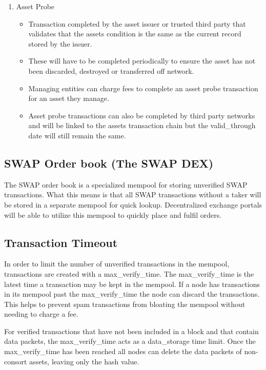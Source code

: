 \documentclass[12pt]{article}
\begin{document}
\begin{enumerate}
	\item Asset Probe
		\begin{itemize}
			\item{Transaction completed by the asset issuer or 
				trusted third party that validates that the assets condition 
				is the same as the current record stored by the issuer.}
			\item{These will have to be 
				completed periodically to ensure the asset has not been 
				discarded, destroyed or transferred off network.}
			\item{Managing 
				entities can charge fees to complete an asset probe transaction 
				for an asset they manage.}
			\item{Asset probe transactions can also 
				be completed by third party networks and will be linked to 
				the assets transaction chain but the valid\_through date 
				will still remain the same.}
		\end{itemize}
\end{enumerate}


\subsection{SWAP Order book (The SWAP DEX)}
The SWAP order book is a specialized mempool for storing unverified SWAP transactions.  What this means is that
all SWAP transactions without a taker will be stored in a separate mempool for quick lookup. 
Decentralized exchange portals will be able to utilize this mempool to quickly place and fulfil orders.


\subsection{Transaction Timeout}


In order to limit the number of unverified transactions in the mempool, 
transactions are created with a max\_verify\_time.  The max\_verify\_time
is the latest time a transaction may be kept in the mempool.  If a node has 
transactions in its mempool past the max\_verify\_time the node can discard 
the transactions.  This helps to prevent spam transactions from bloating the 
mempool without needing to charge a fee.

For verified transactions 
that have not been included in a block and that contain data packets, the max\_verify\_time
acts as a data\_storage time limit.  Once the max\_verify\_time has been reached all nodes 
can delete the data packets of non-consort assets, leaving only the hash value.
\end{document}
